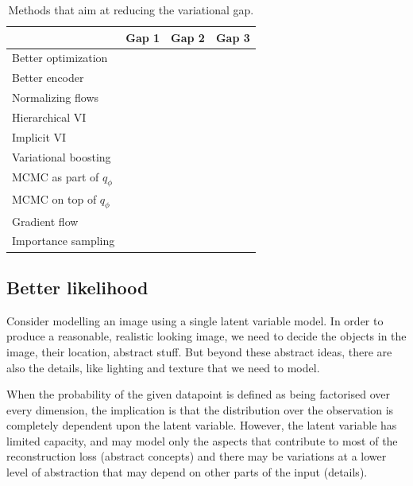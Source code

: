 \documentclass{article}
\newcommand{\xmark}{\ding{55}}%
\begin{document}
\begin{table}
\caption{Methods that aim at reducing the variational gap.}
\label{tb:betterpos}
\centering
\begin{tabular}{lccc}
\toprule
& Gap 1 & Gap 2 & Gap 3 \\
\midrule
Better optimization &&&\xmark\\
Better encoder \cite{cremer2017inference}&&\xmark&\\
Normalizing flows \cite{rezende2015variational,kingma2016improving,huang2017facilitating} &\xmark&&\\
Hierarchical VI \cite{ranganath2016hierarchical,maaloe2016auxiliary}&\xmark&&\\
Implicit VI \cite{mescheder2017adversarial,huszar2017variational}&\xmark&&\\
Variational boosting \cite{miller2016variational}&\xmark&&\\
MCMC as part of $q_\phi$ \cite{salimans2015markov}&\xmark&&\\
MCMC on top of $q_\phi$ \cite{de2001variational,hoffman2017learning} &\xmark&\xmark&\xmark\\
Gradient flow \cite{duvenaud2016early} &\xmark&\xmark&\xmark\\
Importance sampling \cite{burda2015importance}&\xmark&\xmark&\xmark\\
\bottomrule
\end{tabular}
\end{table}



\subsection{Better likelihood}
Consider modelling an image using a single latent variable model. In order to produce a reasonable, realistic looking image, we need to decide the objects in the image, their location, abstract stuff. But beyond these abstract ideas, there are also the details, like lighting and texture that we need to model. 

When the probability of the given datapoint is defined as being factorised over every dimension, the implication is that the distribution over the observation  is completely dependent upon the latent variable. However, the latent variable has limited capacity, and may model only the aspects that contribute to most of the reconstruction loss (abstract concepts) and there may be variations at a lower level of abstraction that may depend on other parts of the input (details).
\end{document}
